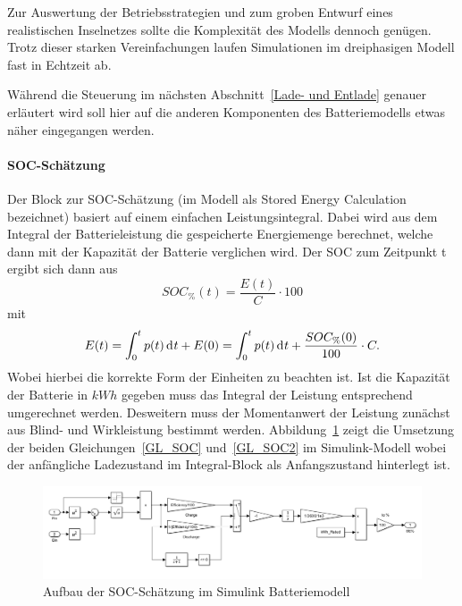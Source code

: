 Zur Auswertung der Betriebsstrategien und zum groben Entwurf eines realistischen Inselnetzes sollte die Komplexität
des Modells dennoch genügen.
Trotz dieser starken Vereinfachungen laufen Simulationen im dreiphasigen Modell fast in Echtzeit ab.

Während die Steuerung im nächsten Abschnitt~\ref{Lade- und Entlade} genauer erläutert wird soll hier auf die anderen
Komponenten des Batteriemodells etwas näher eingegangen werden.

\paragraph{SOC-Schätzung}
Der Block zur SOC-Schätzung (im Modell als Stored Energy Calculation bezeichnet) basiert auf einem einfachen Leistungsintegral.
Dabei wird aus dem Integral der Batterieleistung die gespeicherte Energiemenge berechnet, welche dann mit der Kapazität der Batterie verglichen wird.
Der SOC zum Zeitpunkt t ergibt sich dann aus
\begin{equation}\label{GL_SOC}
	SOC_{\%}(t) = \frac{E(t)}{C} \cdot 100
\end{equation}
mit
\begin{equation}\label{GL_SOC2}
	E(t) = \int_{0}^{t}p(t) \diff t + E(0) = \int_{0}^{t}p(t) \diff t + \frac{SOC_{\%}(0)}{100}\cdot C.
\end{equation}
Wobei hierbei die korrekte Form der Einheiten zu beachten ist.
Ist die Kapazität der Batterie in $kWh$ gegeben muss das Integral der Leistung entsprechend umgerechnet werden.
Desweitern muss der Momentanwert der Leistung zunächst aus Blind- und Wirkleistung bestimmt werden.
Abbildung~\ref{SOC} zeigt die Umsetzung der beiden Gleichungen~\ref{GL_SOC} und~\ref{GL_SOC2} im Simulink-Modell 
wobei der anfängliche Ladezustand im Integral-Block als Anfangszustand hinterlegt ist.
\begin{figure}[h!]
	\centering
	\includegraphics[width=12cm]{Abbildungen/SOC.png}
	\caption{Aufbau der SOC-Schätzung im Simulink Batteriemodell}\label{SOC}
\end{figure}

